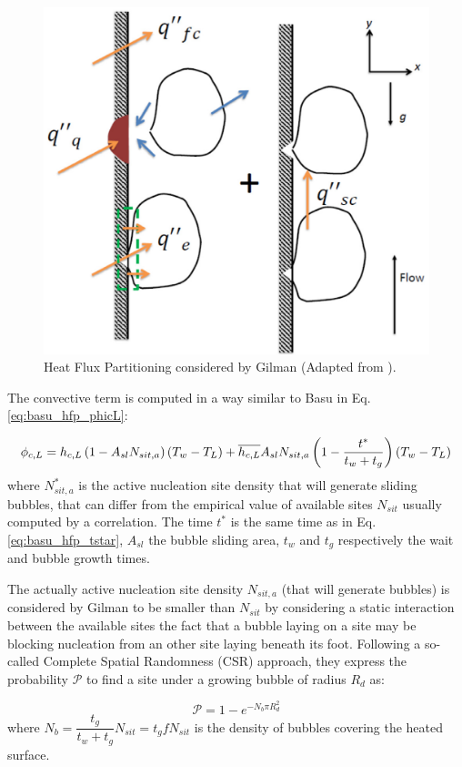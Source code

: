\begin{figure}[!h]
\centering
\includegraphics[width=0.6\linewidth]{img/HFP/Gilman/hfp_model.PNG}
\caption{Heat Flux Partitioning considered by Gilman \cite{gilman_phd} (Adapted from \cite{gilman_self-consistent_2017}).}
\label{fig:gilman_hfp}
\end{figure}


The convective term is computed in a way similar to Basu \etal \cite{basu_wall_2005} in Eq. \ref{eq:basu_hfp_phicL}:

\begin{equation}
\phi_{c,L} = h_{c,L}\left( 1-A_{sl}N_{sit,a} \right)\left( T_{w}-T_{L} \right) + \overline{h_{c,L}}A_{sl}N_{sit,a}\left( 1 - \frac{t^{*}}{t_{w}+t_{g}} \right)\left( T_{w}-T_{L} \right)
\label{eq:gilman_hfp_phicL}
\end{equation}
where $N_{sit,a}^{*}$ is the active nucleation site density that will generate sliding bubbles, that can differ from the empirical value of available sites $N_{sit}$ usually computed by a correlation. The time $t^{*}$ is the same time as in Eq. \ref{eq:basu_hfp_tstar}, $A_{sl}$ the bubble sliding area, $t_{w}$ and $t_{g}$ respectively the wait and bubble growth times.

\npar

The actually active nucleation site density $N_{sit,a}$ (that will generate bubbles) is considered by Gilman to be smaller than $N_{sit}$ by considering a static interaction between the available sites \ie the fact that a bubble laying on a site may be blocking nucleation from an other site laying beneath its foot. Following a so-called Complete Spatial Randomness (CSR) approach, they express the probability $\mathcal{P}$ to find a site under a growing bubble of radius $R_{d}$ as:

\begin{equation}
\mathcal{P} = 1-e^{-N_{b}\pi R_{d}^{2}}
\label{eq:gilman_hfp_pinter}
\end{equation} 
where $N_{b} = \dfrac{t_{g}}{t_{w}+t_{g}}N_{sit} = t_{g} f N_{sit}$ is the density of bubbles covering the heated surface.

